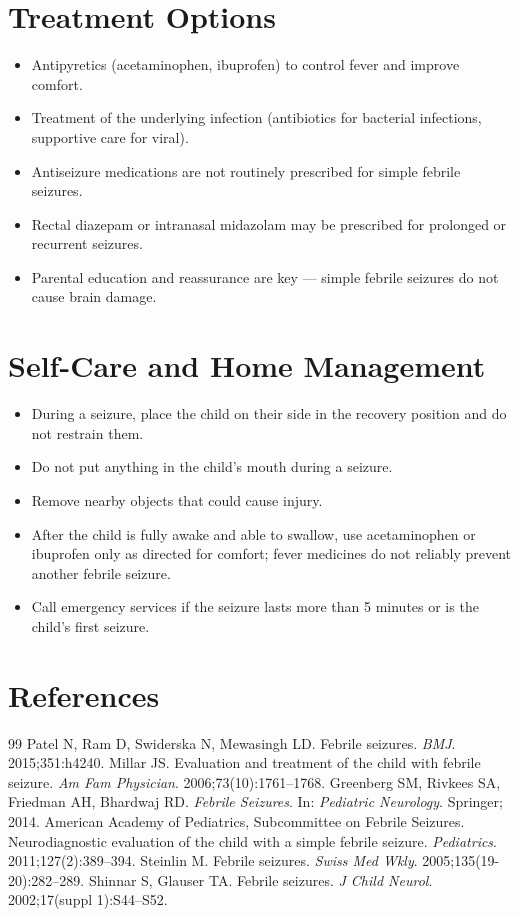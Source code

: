 \section*{Treatment Options}
\begin{itemize}
  \item Antipyretics (acetaminophen, ibuprofen) to control fever and improve comfort.
  \item Treatment of the underlying infection (antibiotics for bacterial infections, supportive care for viral).
  \item Antiseizure medications are not routinely prescribed for simple febrile seizures.
  \item Rectal diazepam or intranasal midazolam may be prescribed for prolonged or recurrent seizures.
  \item Parental education and reassurance are key — simple febrile seizures do not cause brain damage.
\end{itemize}


\section*{Self-Care and Home Management}
\begin{itemize}
  \item During a seizure, place the child on their side in the recovery position and do not restrain them.
  \item Do not put anything in the child's mouth during a seizure.
  \item Remove nearby objects that could cause injury.
  \item After the child is fully awake and able to swallow, use acetaminophen or ibuprofen only as directed for comfort; fever medicines do not reliably prevent another febrile seizure.
  \item Call emergency services if the seizure lasts more than 5 minutes or is the child's first seizure.
\end{itemize}

\section*{References}
\begin{thebibliography}{99}
Patel N, Ram D, Swiderska N, Mewasingh LD. Febrile seizures. \textit{BMJ}. 2015;351:h4240.
Millar JS. Evaluation and treatment of the child with febrile seizure. \textit{Am Fam Physician}. 2006;73(10):1761--1768.
Greenberg SM, Rivkees SA, Friedman AH, Bhardwaj RD. \textit{Febrile Seizures}. In: \textit{Pediatric Neurology}. Springer; 2014.
American Academy of Pediatrics, Subcommittee on Febrile Seizures. Neurodiagnostic evaluation of the child with a simple febrile seizure. \textit{Pediatrics}. 2011;127(2):389--394.
Steinlin M. Febrile seizures. \textit{Swiss Med Wkly}. 2005;135(19-20):282--289.
Shinnar S, Glauser TA. Febrile seizures. \textit{J Child Neurol}. 2002;17(suppl 1):S44--S52.
\end{thebibliography}
